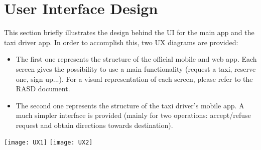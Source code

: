 \pagebreak
\section{User Interface Design}
\label{sec:ui}
This section briefly illustrates the design behind the UI for the main app and the taxi driver app. In order to accomplish this, two UX diagrams are provided:
\begin{itemize}
	\item The first one represents the structure of the official mobile and web app. Each screen gives the possibility to use a main functionality (request a taxi, reserve one, sign up...). For a visual representation of each screen, please refer to the RASD document.
	\item The second one represents the structure of the taxi driver's mobile app. A much simpler interface is provided (mainly for two operations: accept/refuse request and obtain directions towards destination). 
\end{itemize}

\texttt{[image: UX1]}
\texttt{[image: UX2]}